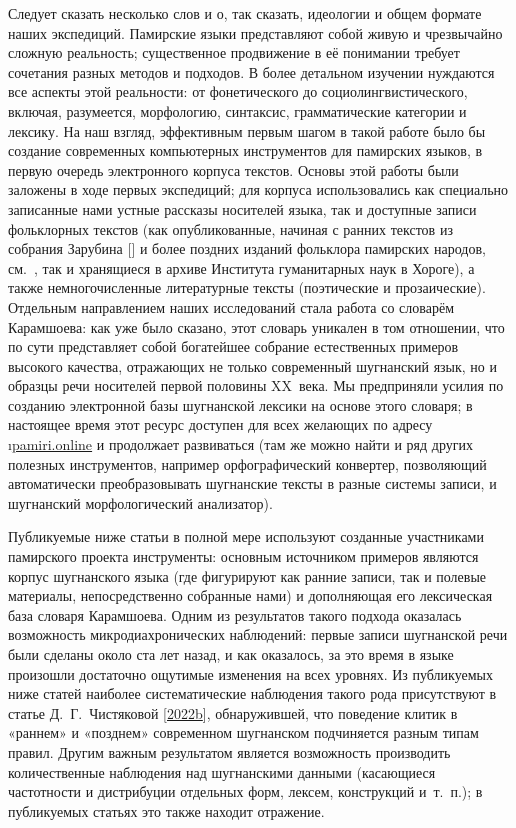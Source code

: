 Следует сказать несколько слов и о, так сказать, идеологии и общем формате наших экспедиций. Памирские языки представляют собой живую и чрезвычайно сложную реальность; существенное продвижение в её понимании требует сочетания разных методов и подходов. В более детальном изучении нуждаются все аспекты этой реальности: от фонетического до социолингвистического, включая, разумеется, морфологию, синтаксис, грамматические категории и лексику. На наш взгляд, эффективным первым шагом в такой работе было бы создание современных компьютерных инструментов для памирских языков, в первую очередь электронного корпуса текстов. Основы этой работы были заложены в ходе первых экспедиций; для корпуса использовались как специально записанные нами устные рассказы носителей языка, так и доступные записи фольклорных текстов (как опубликованные, начиная с ранних текстов из собрания Зарубина [\cite*{zarubin1960}] и более поздних изданий фольклора памирских народов, см.~\parencite{shakarmamadov2005}, так и хранящиеся в архиве Института гуманитарных наук в Хороге), а также немногочисленные литературные тексты (поэтические и прозаические). Отдельным направлением наших исследований стала работа со словарём Карамшоева: как уже было сказано, этот словарь уникален в том отношении, что по сути представляет собой богатейшее собрание естественных примеров высокого качества, отражающих не только современный шугнанский язык, но и образцы речи носителей первой половины XX~века. Мы предприняли усилия по созданию электронной базы шугнанской лексики на основе этого словаря; в настоящее время этот ресурс доступен для всех желающих по адресу \i{\href{https://pamiri.online}{pamiri.online}} и продолжает развиваться (там же можно найти и ряд других полезных инструментов, например орфографический конвертер, позволяющий автоматически преобразовывать шугнанские тексты в разные системы записи, и шугнанский морфологический анализатор).

Публикуемые ниже статьи в полной мере используют созданные участниками памирского проекта инструменты: основным источником примеров являются корпус шугнанского языка (где фигурируют как ранние записи, так и полевые материалы, непосредственно собранные нами) и дополняющая его лексическая база словаря Карамшоева. Одним из результатов такого подхода оказалась возможность микродиахронических наблюдений: первые записи шугнанской речи были сделаны около ста лет назад, и как оказалось, за это время в языке произошли достаточно ощутимые изменения на всех уровнях. Из публикуемых ниже статей наиболее систематические наблюдения такого рода присутствуют в статье Д.~Г.~Чистяковой [\hyperref[chapter-chist-clitic]{2022b}], обнаружившей, что поведение клитик в «раннем» и «позднем» современном шугнанском подчиняется разным типам правил. Другим важным результатом является возможность производить количественные наблюдения над шугнанскими данными (касающиеся частотности и дистрибуции отдельных форм, лексем, конструкций и~т.~п.); в публикуемых статьях это также находит отражение.

